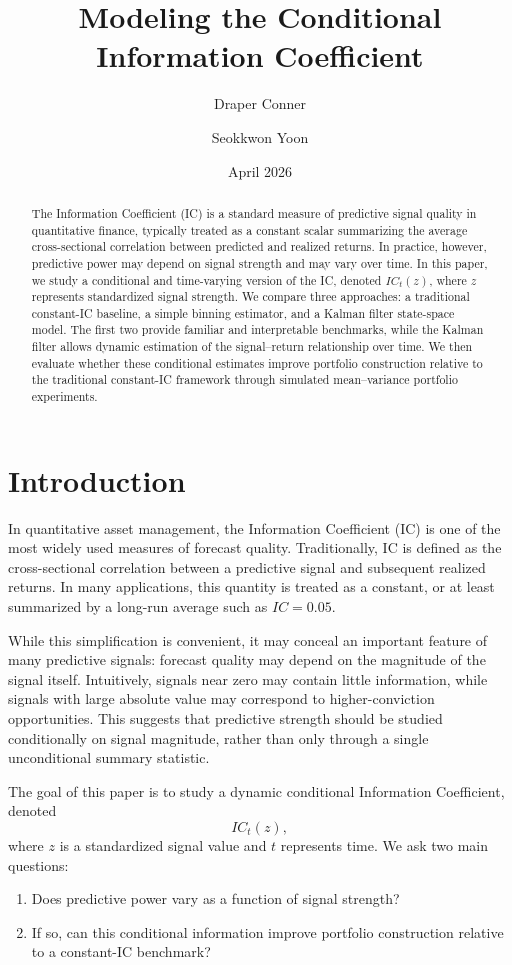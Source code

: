 \documentclass[11pt]{article}
\title{Modeling the Conditional Information Coefficient}
\author{Draper Conner \and Seokkwon Yoon}
\date{April 2026}
\begin{document}
\maketitle

\begin{abstract}
The Information Coefficient (IC) is a standard measure of predictive signal quality in quantitative finance, typically treated as a constant scalar summarizing the average cross-sectional correlation between predicted and realized returns. In practice, however, predictive power may depend on signal strength and may vary over time. In this paper, we study a conditional and time-varying version of the IC, denoted $IC_t(z)$, where $z$ represents standardized signal strength. We compare three approaches: a traditional constant-IC baseline, a simple binning estimator, and a Kalman filter state-space model. The first two provide familiar and interpretable benchmarks, while the Kalman filter allows dynamic estimation of the signal--return relationship over time. We then evaluate whether these conditional estimates improve portfolio construction relative to the traditional constant-IC framework through simulated mean--variance portfolio experiments.
\end{abstract}

\section{Introduction}

In quantitative asset management, the Information Coefficient (IC) is one of the most widely used measures of forecast quality. Traditionally, IC is defined as the cross-sectional correlation between a predictive signal and subsequent realized returns. In many applications, this quantity is treated as a constant, or at least summarized by a long-run average such as $IC = 0.05$.

While this simplification is convenient, it may conceal an important feature of many predictive signals: forecast quality may depend on the magnitude of the signal itself. Intuitively, signals near zero may contain little information, while signals with large absolute value may correspond to higher-conviction opportunities. This suggests that predictive strength should be studied conditionally on signal magnitude, rather than only through a single unconditional summary statistic.

The goal of this paper is to study a dynamic conditional Information Coefficient, denoted
\[
IC_t(z),
\]
where $z$ is a standardized signal value and $t$ represents time. We ask two main questions:
\begin{enumerate}[label=(\roman*)]
    \item Does predictive power vary as a function of signal strength?
    \item If so, can this conditional information improve portfolio construction relative to a constant-IC benchmark?
\end{enumerate}
\end{document}
